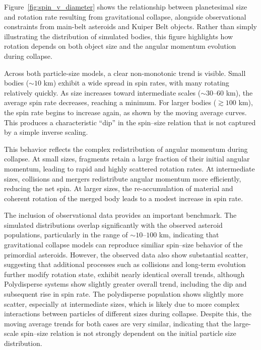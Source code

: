 \documentclass[fleqn,usenatbib]{mnras}
\begin{document}
Figure~\ref{fig:spin_v_diameter} shows the relationship between planetesimal size and rotation rate resulting from gravitational collapse, alongside observational constraints from main-belt asteroids and Kuiper Belt objects. 
Rather than simply illustrating the distribution of simulated bodies, this figure highlights how rotation depends on both object size and the angular momentum evolution during collapse.

Across both particle-size models, a clear non-monotonic trend is visible. Small bodies ($\sim 10$ km) exhibit a wide spread in spin rates, with many rotating relatively quickly.
As size increases toward intermediate scales ($\sim 30$--$60$ km), the average spin rate decreases, reaching a minimum.
For larger bodies ($\gtrsim 100$ km), the spin rate begins to increase again, as shown by the moving average curves.
This produces a characteristic ``dip'' in the spin--size relation that is not captured by a simple inverse scaling.

This behavior reflects the complex redistribution of angular momentum during collapse. 
At small sizes, fragments retain a large fraction of their initial angular momentum, leading to rapid and highly scattered rotation rates.
At intermediate sizes, collisions and mergers redistribute angular momentum more efficiently, reducing the net spin. 
At larger sizes, the re-accumulation of material and coherent rotation of the merged body leads to a modest increase in spin rate.

The inclusion of observational data provides an important benchmark.
The simulated distributions overlap significantly with the observed asteroid populations, particularly in the range of $\sim 10$--$100$ km, indicating that gravitational collapse models can reproduce similiar spin--size behavior of the primordial asteroids. 
However, the observed data also show substantial scatter, suggesting that additional processes such as collisions and long-term evolution further modify rotation state, exhibit nearly identical overall trends, although Polydisperse systems show slightly greater overall trend, including the dip and subsequent rise in spin rate. 
The polydisperse population shows slightly more scatter, especially at intermediate sizes, which is likely due to more complex interactions between particles of different sizes during collapse. 
Despite this, the moving average trends for both cases are very similar, indicating that the large-scale spin--size relation is not strongly dependent on the initial particle size distribution.
\end{document}
